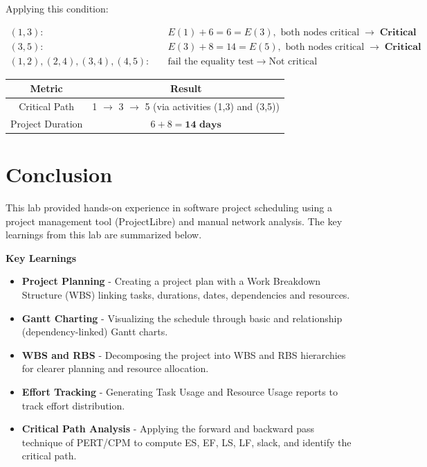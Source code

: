 \documentclass[12pt,a4paper]{article}
\begin{document}
Applying this condition:

\[
\begin{aligned}
(1,3):&\quad E(1)+6 = 6 = E(3), \text{ both nodes critical} \;\to\; \textbf{Critical} \\
(3,5):&\quad E(3)+8 = 14 = E(5), \text{ both nodes critical} \;\to\; \textbf{Critical} \\
(1,2), (2,4), (3,4), (4,5):&\quad \text{fail the equality test} \;\to\; \text{Not critical}
\end{aligned}
\]

\begin{center}
\renewcommand{\arraystretch}{1.3}
\begin{tabular}{|c|c|}
\hline
\textbf{Metric} & \textbf{Result} \\ \hline
Critical Path & 1 $\to$ 3 $\to$ 5 (via activities (1,3) and (3,5)) \\ \hline
Project Duration & $6 + 8 = \textbf{14 days}$ \\ \hline
\end{tabular}
\end{center}

\newpage
\section*{Conclusion}

This lab provided hands-on experience in software project scheduling using a
project management tool (ProjectLibre) and manual network analysis. The key
learnings from this lab are summarized below.

\vspace{0.2cm}
\noindent\textbf{Key Learnings}

\begin{itemize}[leftmargin=*, itemsep=6pt]
    \item \textbf{Project Planning} - Creating a project plan with a Work
          Breakdown Structure (WBS) linking tasks, durations, dates,
          dependencies and resources.
    \item \textbf{Gantt Charting} - Visualizing the schedule through basic
          and relationship (dependency-linked) Gantt charts.
    \item \textbf{WBS and RBS} - Decomposing the project into WBS and RBS
          hierarchies for clearer planning and resource allocation.
    \item \textbf{Effort Tracking} - Generating Task Usage and Resource
          Usage reports to track effort distribution.
    \item \textbf{Critical Path Analysis} - Applying the forward and backward
          pass technique of PERT/CPM to compute ES, EF, LS, LF, slack, and
          identify the critical path.
\end{itemize}
\end{document}
